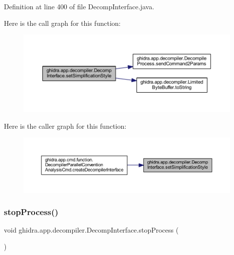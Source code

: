 Definition at line 400 of file Decomp\+Interface.\+java.

Here is the call graph for this function\+:
\nopagebreak
\begin{figure}[H]
\begin{center}
\leavevmode
\includegraphics[width=350pt]{classghidra_1_1app_1_1decompiler_1_1_decomp_interface_a6f21c198b5a43c80122198470b0310a8_cgraph}
\end{center}
\end{figure}
Here is the caller graph for this function\+:
\nopagebreak
\begin{figure}[H]
\begin{center}
\leavevmode
\includegraphics[width=350pt]{classghidra_1_1app_1_1decompiler_1_1_decomp_interface_a6f21c198b5a43c80122198470b0310a8_icgraph}
\end{center}
\end{figure}
\mbox{\label{classghidra_1_1app_1_1decompiler_1_1_decomp_interface_a9c46f9ab1edab88fecfb1ff9faa2d1df}} 
\subsubsection{\texorpdfstring{stopProcess()}{stopProcess()}}
{\footnotesize\ttfamily void ghidra.\+app.\+decompiler.\+Decomp\+Interface.\+stop\+Process (\begin{DoxyParamCaption}{ }\end{DoxyParamCaption})\hspace{0.3cm}{\ttfamily [inline]}}

